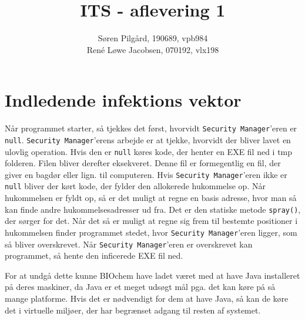 \documentclass[10pt,a4paper,danish]{article}
\title{ITS - aflevering 1}
\author{Søren Pilgård, 190689, vpb984\\
René Løwe Jacobsen, 070192, vlx198}
\begin{document}
\maketitle
\newpage

\tableofcontents
\newpage

\section{Indledende infektions vektor}
Når programmet starter, så tjekkes det først, hvorvidt \texttt{Security Manager}'eren
er \texttt{null}. \texttt{Security Manager}'erens arbejde er at tjekke, hvorvidt
der bliver lavet en ulovlig operation.
Hvis den er \texttt{null} køres kode, der henter en EXE fil ned
i tmp folderen. Filen bliver derefter eksekveret.
Denne fil er formegentlig en fil, der giver en bagdør eller lign. til computeren.
Hvis \texttt{Security Manager}'eren ikke er \texttt{null} bliver der kørt kode,
der fylder den allokerede hukommelse op. Når hukommelsen er fyldt op, så er det
muligt at regne en basis adresse, hvor man så kan finde andre hukommelsesadresser
ud fra.
Det er den statiske metode \texttt{spray()}, der sørger for det.
Når det så er muligt at regne sig frem til bestemte positioner i hukommelsen
finder programmet stedet, hvor \texttt{Security Manager}'eren ligger, som
så bliver overskrevet.
Når \texttt{Security Manager}'eren er overskrevet kan programmet, så hente den
inficerede EXE fil ned.

For at undgå dette kunne BIOchem have ladet været med at have Java installeret på deres maskiner,
da Java er et meget udsøgt mål pga. det kan køre på så mange platforme.
Hvis det er nødvendigt for dem at have Java, så kan de køre det i virtuelle miljøer,
der har begrænset adgang til resten af systemet.




\end{document}
